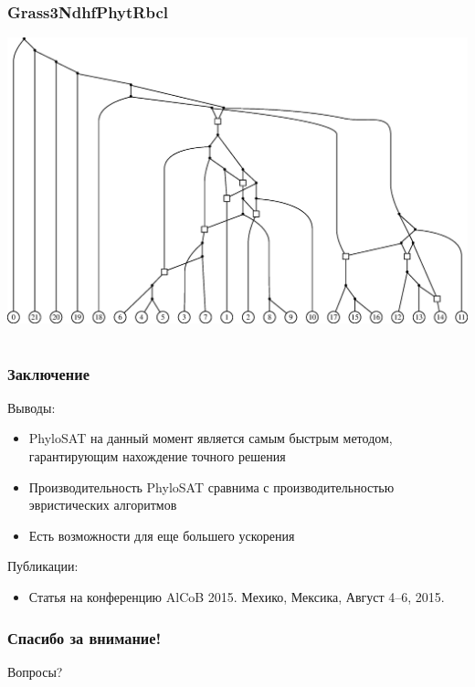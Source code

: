 \documentclass[hyperref={unicode}]{beamer}
\begin{document}
\begin{frame}
\frametitle{Grass3NdhfPhytRbcl}

\includegraphics[width=\linewidth]{img/Grass3NdhfPhytRbcl.eps}
	
\end{frame}

\section{}

\begin{frame}
\frametitle{Заключение}

Выводы:
\begin{itemize}
	\item PhyloSAT на данный момент является самым быстрым методом, гарантирующим нахождение точного решения
	\item Производительность PhyloSAT сравнима с производительностью эвристических алгоритмов
	\item Есть возможности для еще большего ускорения
\end{itemize}

Публикации:
\begin{itemize}
	\item Статья на конференцию AlCoB 2015. Мехико, Мексика, Август 4--6, 2015.
\end{itemize}

\end{frame}

\begin{frame}
\frametitle{Спасибо за внимание!}

Вопросы?

\end{frame}
\end{document}

